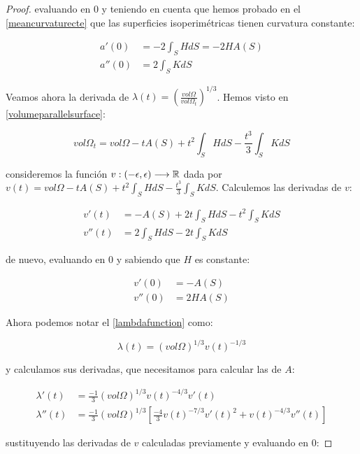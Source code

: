 \begin{proof}
evaluando en $0$ y teniendo en cuenta que hemos probado en el \autoref{meancurvaturecte} que las superficies isoperimétricas tienen curvatura constante:

\begin{align*}
    a'(0) &= -2\int_{S} HdS = -2HA(S) \\
    a''(0) &= 2\int_{S} KdS
\end{align*}

Veamos ahora la derivada de $\lambda(t) = \left( \frac{vol \Omega}{vol \Omega_t} \right) ^{1/3}$. Hemos visto en \autoref{volumeparallelsurface}:

\begin{equation*}
    vol \Omega_t = vol \Omega - tA(S) + t^2\int_S HdS - \frac{t^3}{3}\int_S KdS
\end{equation*}

consideremos la función $v: (-\epsilon, \epsilon) \longrightarrow \mathbb{R}$ dada por $v(t) = vol \Omega - tA(S) + t^2\int_S HdS - \frac{t^3}{3}\int_S KdS$. Calculemos las derivadas de $v$:

\begin{align*}
    v'(t) &= - A(S) + 2t\int_S HdS - t^2\int_S KdS \\
    v''(t) &= 2\int_{S} HdS - 2t\int_S KdS
\end{align*}

de nuevo, evaluando en $0$ y sabiendo que $H$ es constante:

\begin{align*}
    v'(0) &= -A(S) \\
    v''(0) &= 2HA(S)
\end{align*}

Ahora podemos notar el \autoref{lambdafunction} como:

\begin{equation*}
    \lambda(t) = (vol \Omega)^{1/3} v(t)^{-1/3}
\end{equation*}

y calculamos sus derivadas, que necesitamos para calcular las de $A$:

\begin{align*}
    \lambda'(t) &= \frac{-1}{3} (vol\Omega)^{1/3} v(t)^{-4/3} v'(t) \\
    \lambda''(t) &= \frac{-1}{3} (vol\Omega)^{1/3} \left[ \frac{-4}{3}v(t)^{-7/3} v'(t)^2 + v(t)^{-4/3}v''(t) \right]
\end{align*}

sustituyendo las derivadas de $v$ calculadas previamente y evaluando en $0$:


\end{proof}
